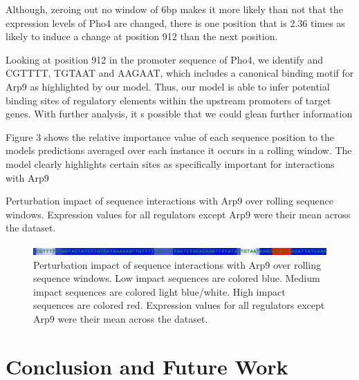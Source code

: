 \documentclass{article}
\begin{document}
Although, zeroing out no window of 6bp makes it more likely than not that the expression levels of Pho4 are changed, there is one position that is 2.36 times as likely to induce a change at position 912 than the next position.

Looking at position 912 in the promoter sequence of Pho4, we identify and CGTTTT, TGTAAT and AAGAAT, which includes a canonical binding motif for Arp9 as highlighted by our model. Thus, our model is able to infer potential binding sites of regulatory elements within the upstream promoters of target genes. With further analysis, it s possible that we could glean further information 

Figure 3 shows the relative importance value of each sequence position to the models predictions averaged over each instance it occurs in a rolling window. The model clearly highlights certain sites as specifically important for interactions with Arp9

Perturbation impact of sequence interactions with Arp9 over rolling sequence windows. Expression values for all regulators except Arp9 were their mean across the dataset.

	
	\begin{figure}[H]
	\begin{center}
	\includegraphics[scale=0.4]{fig/SequenceInterpretation}
	\end{center}
	\caption{Perturbation impact of sequence interactions with Arp9 over rolling sequence windows. Low impact sequences are colored blue. Medium impact sequences are colored light blue/white. High impact sequences are colored red. Expression values for all regulators except Arp9 were their mean across the dataset.}
	\end{figure}


\section{Conclusion and Future Work}
\end{document}
